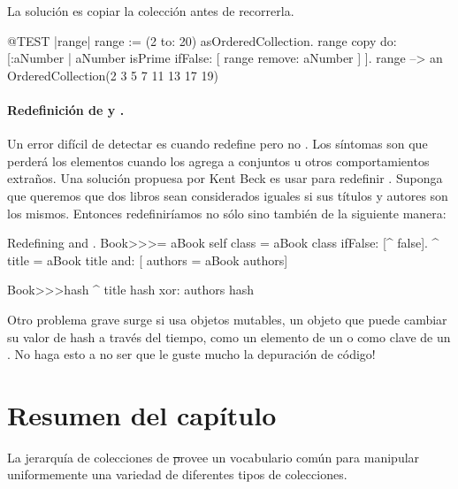 \documentclass[a4paper,10pt,twoside]{book}
\begin{document}
La soluci\'on es copiar la colecci\'on antes de recorrerla.
\begin{code}{@TEST |range|}
range := (2 to: 20) asOrderedCollection.
range copy do: [:aNumber | aNumber isPrime ifFalse: [ range remove: aNumber ] ].
range --> an OrderedCollection(2 3 5 7 11 13 17 19)
\end{code}

\paragraph{Redefinici\'on de \ct{=} y .}
Un error dif\'icil de detectar es cuando redefine \ct{=} pero no . Los s\'intomas son que perder\'a los elementos cuando los agrega a conjuntos u otros comportamientos extra\~{n}os. Una soluci\'on propuesa por Kent Beck es usar  para redefinir .
Suponga que queremos que dos libros sean considerados iguales si sus t\'itulos y autores son los mismos.
Entonces redefinir\'iamos no s\'olo \ct{=} sino tambi\'en  de la siguiente manera:

\begin{method}{Redefining \lct{=} and .}
Book>>>= aBook
   self class = aBook class ifFalse: [^ false].
   ^ title = aBook title and: [ authors = aBook authors]

Book>>>hash 
   ^ title hash xor: authors hash
\end{method}

Otro problema grave surge si usa objetos mutables, \ie un objeto que puede cambiar su valor de hash a trav\'es del tiempo, como un elemento de un  o como clave de un .
No haga esto a no ser que le guste mucho la depuraci\'on de c\'odigo!

\section{Resumen del cap\'itulo}

La jerarqu\'ia de colecciones de \st provee un vocabulario com\'un para manipular uniformemente una variedad de diferentes tipos de colecciones.
\end{document}
